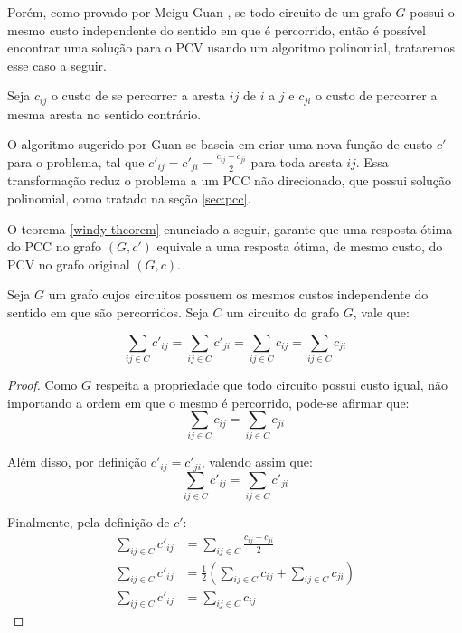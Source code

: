         Porém, como provado por Meigu Guan \cite{guan-windy}, se todo circuito de um grafo $G$ possui o mesmo custo independente do sentido em que é percorrido, então é possível encontrar uma solução para o PCV usando um algoritmo polinomial, trataremos esse caso a seguir.

        Seja $c_{ij}$ o custo de se percorrer a aresta $ij$ de $i$ a $j$ e $c_{ji}$ o custo de percorrer a mesma aresta no sentido contrário.

        O algoritmo sugerido por Guan se baseia em criar uma nova função de custo $c'$ para o problema, tal que $c'_{ij} = c'_{ji} = \frac{c_{ij} + c_{ji}}{2}$ para toda aresta $ij$. 
        Essa transformação reduz o problema a um PCC não direcionado, que possui solução polinomial, como tratado na seção \ref{sec:pcc}.

        O teorema \ref{windy-theorem} enunciado a seguir, garante que uma resposta ótima do PCC no grafo $(G, c')$ equivale a uma resposta ótima, de mesmo custo, do PCV no grafo original $(G, c)$.

        \begin{lemma}
            \label{lemma:pccv}
            Seja $G$ um grafo cujos circuitos possuem os mesmos custos independente do sentido em que são percorridos.
            Seja $C$ um circuito do grafo $G$, vale que:

            \[
                \sum_{ij \in C} c'_{ij} = \sum_{ij \in C} c'_{ji} =  \sum_{ij \in C} c_{ij} =  \sum_{ij \in C} c_{ji}
            \]
        \end{lemma}
        \begin{proof}
            Como $G$ respeita a propriedade que todo circuito possui custo igual, não importando a ordem em que o mesmo é percorrido, pode-se afirmar que:
            \[
                \sum_{ij \in C} c_{ij} =  \sum_{ij \in C} c_{ji}
            \]

            Além disso, por definição $c'_{ij} = c'_{ji}$, valendo assim que:
            \[
                \sum_{ij \in C} c'_{ij} = \sum_{ij \in C} c'_{ji} 
            \]

            Finalmente, pela definição de $c'$: 
            \begin{align*}
                \sum_{ij \in C} c'_{ij} &= \sum_{ij \in C} \frac{c_{ij} + c_{ji}}{2} \\
                \sum_{ij \in C} c'_{ij} &= \frac{1}{2} \left(\sum_{ij \in C}c_{ij} + \sum_{ij \in C}c_{ji} \right) \\
                \sum_{ij \in C} c'_{ij} &= \sum_{ij \in C} c_{ij}
            \end{align*}

        \end{proof}


